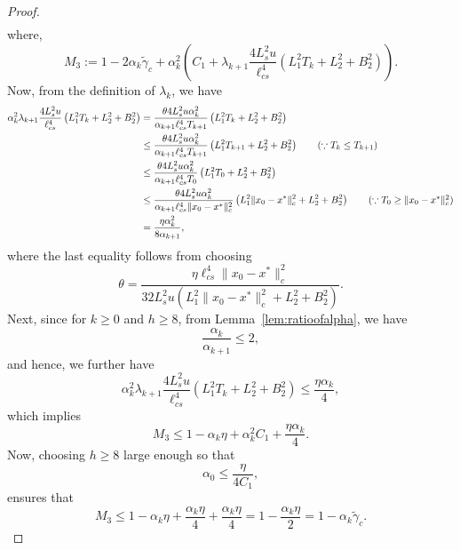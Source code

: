 \documentclass[10pt,a4paper]{amsart}
\newcommand{\lcs}{\ell_{cs}}
\newcommand{\lrp}[1]{\left( #1 \right)}
\begin{document}
\begin{proof}
\begin{align*}
        \end{align*}
        where, 
        \[ M_3 := 1 - 2\alpha_k\tilde{\gamma}_c + \alpha^2_k \lrp{  C_1 + \lambda_{k+1}  \frac{ 4 L^2_s u}{\lcs^4}\lrp{L^2_1 T_k + L^2_2 + B^2_2 }  }. \]
    Now, from the definition of $\lambda_k$, we have
    \begin{align*}
        \alpha^2_k \lambda_{k+1}\frac{4 L^2_s u}{\lcs^4}\lrp{L^2_1 T_k + L^2_2 + B^2_2}
        &=    \frac{\theta 4 L^2_s u \alpha^2_k}{\alpha_{k+1}\lcs^4 T_{k+1}}\lrp{L^2_1 T_k + L^2_2 + B^2_2} \\
        &\le \frac{\theta 4 L^2_s u \alpha^2_k}{\alpha_{k+1}\lcs^4 T_{k+1}}\lrp{L^2_1 T_{k+1} + L^2_2 + B^2_2} \tag{$\because T_k\le T_{k+1}$}\\
        &\le \frac{\theta 4 L^2_s u \alpha^2_k}{\alpha_{k+1}\lcs^4 T_0}\lrp{L^2_1 T_0 + L^2_2 + B^2_2}\\
        &\le \frac{\theta 4 L^2_s u \alpha^2_k}{\alpha_{k+1}\lcs^4 \|x_0 - x^*\|^2_c}\lrp{L^2_1 \|x_0 - x^*\|^2_c + L^2_2 + B^2_2} \tag{$\because T_0 \ge \|x_0 - x^*\|^2_c$} \\
        &= \frac{\eta \alpha^2_k}{8 \alpha_{k+1}},
    \end{align*}
    where the last equality follows from choosing 
    \[ \theta =  \frac{\eta \lcs^4 \|x_0 - x^*\|^2_c}{32 L^2_s u  \lrp{L^2_1\|x_0 - x^*\|^2_c + L^2_2 + B^2_2} }. \]
    Next, since for $k \ge 0$ and $h \ge 8$, from Lemma~\ref{lem:ratioofalpha}, we have 
    \[ \frac{\alpha_{k}}{\alpha_{k+1}} \le 2, \]
    and hence, we further have
    \[ \alpha^2_k \lambda_{k+1}  \frac{4 L^2_s u}{\lcs^4}\lrp{L^2_1 T_k + L^2_2 + B^2_2} \le \frac{\eta \alpha_k}{4}, \]
    which implies 
    \[ M_3 \le  1 - \alpha_k \eta + \alpha^2_k C_1 + \frac{\eta\alpha_k}{4}. \]
    Now, choosing $h \ge 8$ large enough so that \[ \alpha_0  \le \frac{\eta}{4 C_1}, \]
    ensures that 
    \[ M_3 \le 1 - \alpha_k \eta + \frac{\alpha_k \eta}{4} + \frac{\alpha_k \eta}{4} = 1 - \frac{\alpha_k \eta}{2} = 1 - \alpha_k \tilde{\gamma}_c. \]


\end{proof}
\end{document}
